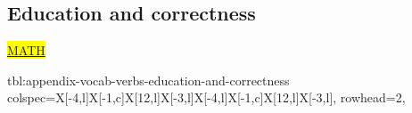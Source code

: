 \documentclass[../nihongo-gakushuu-kyouzai-vocabulary.tex]{subfiles}
\begin{document}
\subsection{Education and correctness}
\hl{\href{https://japanese.stackexchange.com/questions/56962/standard-mathematical-operations-expressed-in-japanese}{MATH}}

{tbl:appendix-vocab-verbs-education-and-correctness}  %
{}  %
{
    colspec={X[-4,l]X[-1,c]X[12,l]X[-3,l]X[-4,l]X[-1,c]X[12,l]X[-3,l]},
    rowhead=2,
}  %
\end{document}
